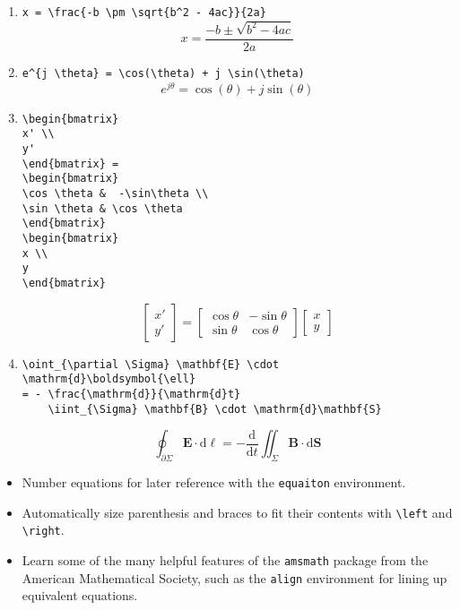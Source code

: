 \begin{enumerate}
\item \verb|x = \frac{-b \pm \sqrt{b^2 - 4ac}}{2a}|
    \[x = \frac{-b \pm \sqrt{b^2 - 4 a c}}{2a} \]

\item \verb|e^{j \theta} = \cos(\theta) + j \sin(\theta)|
    \[e^{j \theta} = \cos(\theta) + j \sin(\theta)\]

\item
\begin{verbatim}
\begin{bmatrix}
x' \\
y'
\end{bmatrix} =
\begin{bmatrix}
\cos \theta &  -\sin\theta \\
\sin \theta & \cos \theta
\end{bmatrix}
\begin{bmatrix}
x \\
y
\end{bmatrix}
\end{verbatim}
\[
\begin{bmatrix}
x' \\
y'
\end{bmatrix} =
\begin{bmatrix}
\cos \theta &  -\sin\theta \\
\sin \theta & \cos \theta
\end{bmatrix}
\begin{bmatrix}
x \\
y
\end{bmatrix}
\]

\item
\begin{verbatim}
\oint_{\partial \Sigma} \mathbf{E} \cdot
\mathrm{d}\boldsymbol{\ell}
= - \frac{\mathrm{d}}{\mathrm{d}t}
    \iint_{\Sigma} \mathbf{B} \cdot \mathrm{d}\mathbf{S}
\end{verbatim}
    \[\oint_{\partial \Sigma} \mathbf{E} \cdot \mathrm{d}\boldsymbol{\ell}  = - \frac{\mathrm{d}}{\mathrm{d}t} \iint_{\Sigma} \mathbf{B} \cdot \mathrm{d}\mathbf{S}\]
\end{enumerate}

\exercises{}
\begin{itemize}
\item Number equations for later reference with the \texttt{equaiton} environment.
\item Automatically size parenthesis and braces to fit their contents
    with \verb|\left| and \verb|\right|.
\item Learn some of the many helpful features of the \texttt{amsmath}
    package from the American Mathematical Society,
    such as the \texttt{align} environment for lining up
    equivalent equations.
\end{itemize}
